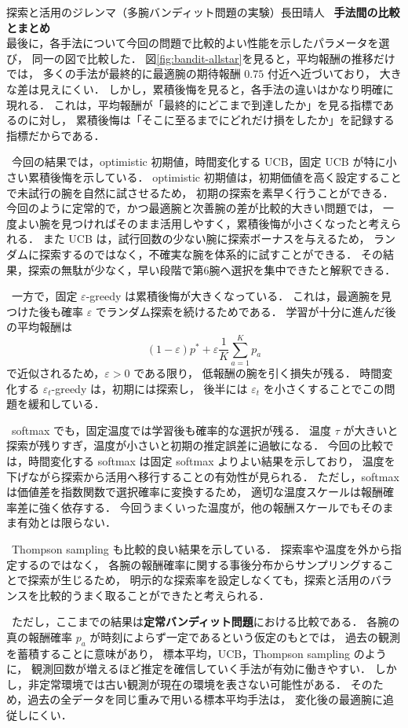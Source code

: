 \begin{column}{探索と活用のジレンマ（多腕バンディット問題の実験）}{長田晴人}
\ \textbf{手法間の比較とまとめ}\\
最後に，各手法について今回の問題で比較的よい性能を示したパラメータを選び，
同一の図で比較した．
図\ref{fig:bandit-allstar}を見ると，平均報酬の推移だけでは，
多くの手法が最終的に最適腕の期待報酬 $0.75$ 付近へ近づいており，
大きな差は見えにくい．
しかし，累積後悔を見ると，各手法の違いはかなり明確に現れる．
これは，平均報酬が「最終的にどこまで到達したか」を見る指標であるのに対し，
累積後悔は「そこに至るまでにどれだけ損をしたか」を記録する指標だからである．

\ 今回の結果では，optimistic 初期値，時間変化する UCB，固定 UCB が特に小さい累積後悔を示している．
optimistic 初期値は，初期価値を高く設定することで未試行の腕を自然に試させるため，
初期の探索を素早く行うことができる．
今回のように定常的で，かつ最適腕と次善腕の差が比較的大きい問題では，
一度よい腕を見つければそのまま活用しやすく，累積後悔が小さくなったと考えられる．
また UCB は，試行回数の少ない腕に探索ボーナスを与えるため，
ランダムに探索するのではなく，不確実な腕を体系的に試すことができる．
その結果，探索の無駄が少なく，早い段階で第6腕へ選択を集中できたと解釈できる．

\ 一方で，固定 $\varepsilon$-greedy は累積後悔が大きくなっている．
これは，最適腕を見つけた後も確率 $\varepsilon$ でランダム探索を続けるためである．
学習が十分に進んだ後の平均報酬は
\[
    (1-\varepsilon)p^\ast
    +
    \varepsilon \frac{1}{K}\sum_{a=1}^{K}p_a
\]
で近似されるため，$\varepsilon>0$ である限り，
低報酬の腕を引く損失が残る．
時間変化する $\varepsilon_t$-greedy は，初期には探索し，
後半には $\varepsilon_t$ を小さくすることでこの問題を緩和している．

\ softmax でも，固定温度では学習後も確率的な選択が残る．
温度 $\tau$ が大きいと探索が残りすぎ，温度が小さいと初期の推定誤差に過敏になる．
今回の比較では，時間変化する softmax は固定 softmax よりよい結果を示しており，
温度を下げながら探索から活用へ移行することの有効性が見られる．
ただし，softmax は価値差を指数関数で選択確率に変換するため，
適切な温度スケールは報酬確率差に強く依存する．
今回うまくいった温度が，他の報酬スケールでもそのまま有効とは限らない．

\ Thompson sampling も比較的良い結果を示している．
探索率や温度を外から指定するのではなく，
各腕の報酬確率に関する事後分布からサンプリングすることで探索が生じるため，
明示的な探索率を設定しなくても，探索と活用のバランスを比較的うまく取ることができたと考えられる．

\ ただし，ここまでの結果は\textbf{定常バンディット問題}における比較である．
各腕の真の報酬確率 $p_a$ が時刻によらず一定であるという仮定のもとでは，
過去の観測を蓄積することに意味があり，
標本平均，UCB，Thompson sampling のように，
観測回数が増えるほど推定を確信していく手法が有効に働きやすい．
しかし，非定常環境では古い観測が現在の環境を表さない可能性がある．
そのため，過去の全データを同じ重みで用いる標本平均手法は，
変化後の最適腕に追従しにくい．


\end{column}
